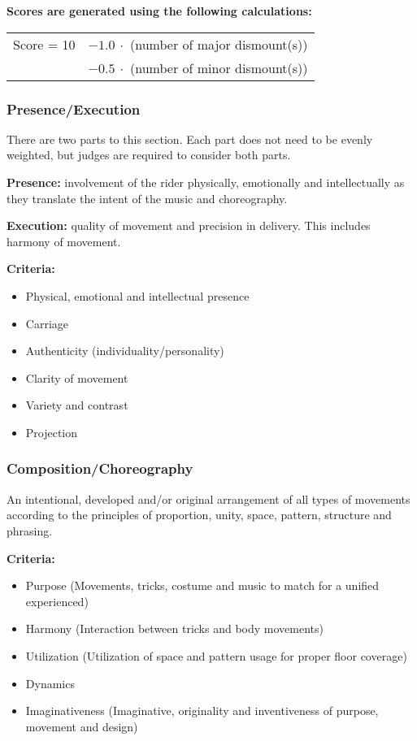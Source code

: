 \textbf{Scores are generated using the following calculations:}

\begin{tabular}{r l}
Score = 10 & $- 1.0\ \cdot$ (number of major dismount(s)) \\
 & $- 0.5\ \cdot$ (number of minor dismount(s)) \\
\end{tabular}


\subsubsection{Presence/Execution \label{subsec:freestyle_individual-performance-score_presence-execution}}

There are two parts to this section.
Each part does not need to be evenly weighted, but judges are required to consider both parts.

\textbf{Presence:} involvement of the rider physically, emotionally and intellectually as they translate the intent of the music and choreography.

\textbf{Execution:} quality of movement and precision in delivery.
This includes harmony of movement.

\textbf{Criteria:}
\begin{itemize}
\item Physical, emotional and intellectual presence
\item Carriage
\item Authenticity (individuality/personality)
\item Clarity of movement
\item Variety and contrast
\item Projection
\end{itemize}

\subsubsection{Composition/Choreography}

An intentional, developed and/or original arrangement of all types of movements according to the principles of proportion, unity, space, pattern, structure and phrasing.

\textbf{Criteria:}
\begin{itemize}
\item Purpose (Movements, tricks, costume and music to match for a unified experienced)
\item Harmony (Interaction between tricks and body movements)
\item Utilization (Utilization of space and pattern usage for proper floor coverage)
\item Dynamics
\item Imaginativeness (Imaginative, originality and inventiveness of purpose, movement and design)
\end{itemize}

